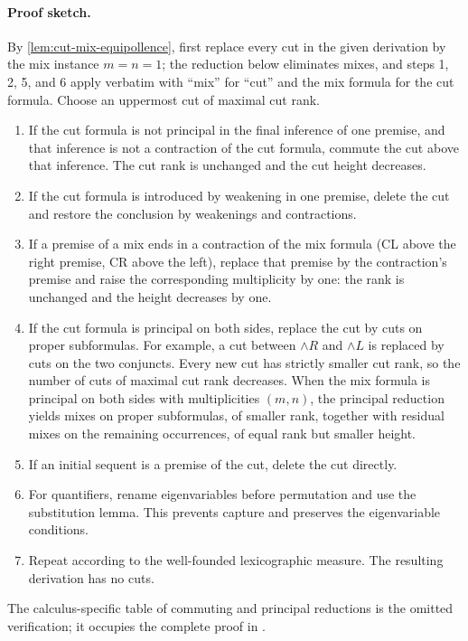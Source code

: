 \documentclass[11pt,oneside,openany]{book}
\theoremstyle{definition}
\theoremstyle{plain}
\theoremstyle{remark}
\begin{document}
\paragraph{Proof sketch.}
By \cref{lem:cut-mix-equipollence}, first replace every cut in the given
derivation by the mix instance \(m=n=1\); the reduction below eliminates
mixes, and steps 1, 2, 5, and 6 apply verbatim with ``mix'' for ``cut''
and the mix formula for the cut formula.
Choose an uppermost cut of maximal cut rank.
\begin{enumerate}
  \item If the cut formula is not principal in the final inference of one
        premise, and that inference is not a contraction of the cut formula,
        commute the cut above that inference.  The cut rank is
        unchanged and the cut height decreases.
  \item If the cut formula is introduced by weakening in one premise, delete
        the cut and restore the conclusion by weakenings and contractions.
  \item If a premise of a mix ends in a contraction of the mix formula
        (\textsc{CL} above the right premise, \textsc{CR} above the
        left), replace that premise by the contraction's premise and
        raise the corresponding multiplicity by one: the rank is
        unchanged and the height decreases by one.
  \item If the cut formula is principal on both sides, replace the cut by cuts
        on proper subformulas.  For example, a cut between \(\land R\) and
        \(\land L\) is replaced by cuts on the two conjuncts.  Every new cut
        has strictly smaller cut rank, so the number of cuts of maximal cut
        rank decreases.  When the mix formula is principal on both sides
        with multiplicities \((m,n)\), the principal reduction yields
        mixes on proper subformulas, of smaller rank, together with
        residual mixes on the remaining occurrences, of equal rank but
        smaller height.
  \item If an initial sequent is a premise of the cut, delete the cut directly.
  \item For quantifiers, rename eigenvariables before permutation and use the
        substitution lemma.  This prevents capture and preserves the
        eigenvariable conditions.
  \item Repeat according to the well-founded lexicographic measure.  The
        resulting derivation has no cuts.
\end{enumerate}
The calculus-specific table of commuting and principal reductions is the
omitted verification; it occupies the
complete proof in
\cite{TroelstraSchwichtenberg2000,NegriVonPlato2001}.
\end{document}
